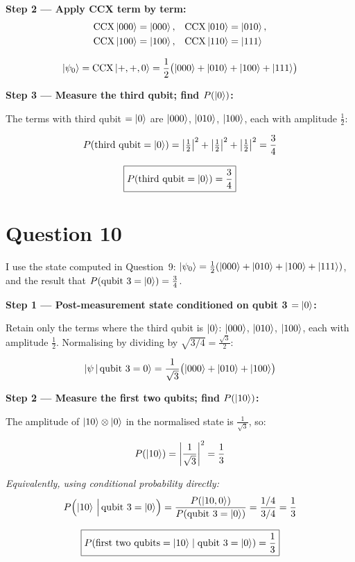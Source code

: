\documentclass[12pt,a4paper]{article}
\begin{document}
\textbf{Step 2 --- Apply CCX term by term:}
\begin{align*}
\mathrm{CCX}\ket{000}&=\ket{000}, &
\mathrm{CCX}\ket{010}&=\ket{010}, \\
\mathrm{CCX}\ket{100}&=\ket{100}, &
\mathrm{CCX}\ket{110}&=\ket{111}
\end{align*}

\[
  \ket{\psi_0}=\mathrm{CCX}\ket{+,+,0}
  =\frac{1}{2}\bigl(\ket{000}+\ket{010}+\ket{100}+\ket{111}\bigr)
\]

\textbf{Step 3 --- Measure the third qubit; find $P(\ket{0})$:}

The terms with third qubit $=\ket{0}$ are $\ket{000}$, $\ket{010}$, $\ket{100}$,
each with amplitude $\tfrac{1}{2}$:

\[
  P(\text{third qubit}=\ket{0})
  = \left|\tfrac{1}{2}\right|^2+\left|\tfrac{1}{2}\right|^2+\left|\tfrac{1}{2}\right|^2
  = \frac{3}{4}
\]

\[
  \boxed{P(\text{third qubit}=\ket{0})=\frac{3}{4}}
\]

\section*{Question 10}

I use the state computed in Question~9:
$\ket{\psi_0}=\tfrac{1}{2}(\ket{000}+\ket{010}+\ket{100}+\ket{111})$,
and the result that $P(\text{qubit 3}=\ket{0})=\tfrac{3}{4}$.

\medskip
\textbf{Step 1 --- Post-measurement state conditioned on qubit 3 $=\ket{0}$:}

Retain only the terms where the third qubit is $\ket{0}$:
$\ket{000}$, $\ket{010}$, $\ket{100}$, each with amplitude $\tfrac{1}{2}$.
Normalising by dividing by $\sqrt{3/4}=\tfrac{\sqrt{3}}{2}$:

\[
  \ket{\psi\,|\,\text{qubit 3}=0}
  = \frac{1}{\sqrt{3}}\bigl(\ket{000}+\ket{010}+\ket{100}\bigr)
\]

\textbf{Step 2 --- Measure the first two qubits; find $P(\ket{10})$:}

The amplitude of $\ket{10}\otimes\ket{0}$ in the normalised state is
$\tfrac{1}{\sqrt{3}}$, so:

\[
  P(\ket{10})=\left|\frac{1}{\sqrt{3}}\right|^2=\frac{1}{3}
\]

\textit{Equivalently, using conditional probability directly:}
\[
  P\!\left(\ket{10}\,\Big|\,\text{qubit 3}=\ket{0}\right)
  =\frac{P(\ket{10,0})}{P(\text{qubit 3}=\ket{0})}
  =\frac{1/4}{3/4}=\frac{1}{3}
\]

\[
  \boxed{P\!\left(\text{first two qubits}=\ket{10}\;\middle|\;\text{qubit 3}=\ket{0}\right)
         =\frac{1}{3}}
\]
\end{document}
